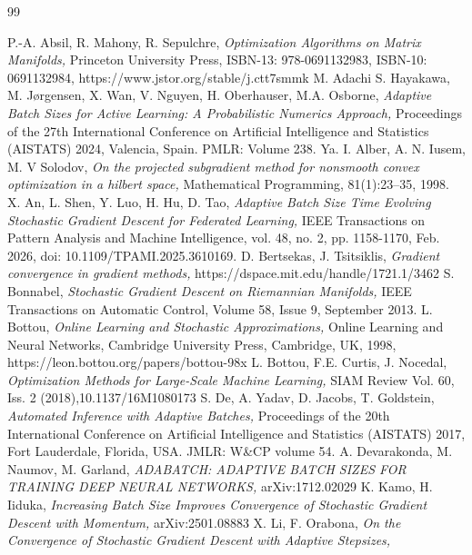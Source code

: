 \documentclass{amsart}
\theoremstyle{plain}
\theoremstyle{definition}
\theoremstyle{remark}
\numberwithin{theorem}{section}
\numberwithin{equation}{section}
\begin{document}
\begin{thebibliography}{99}
  
   P.-A. Absil, R. Mahony, R. Sepulchre,
   \emph{Optimization Algorithms on Matrix Manifolds,}
   Princeton University Press,  ISBN-13: 978-0691132983, ISBN-10: 0691132984, https://www.jstor.org/stable/j.ctt7smmk
   M. Adachi S. Hayakawa, M. Jørgensen, X. Wan, V. Nguyen, H. Oberhauser, M.A. Osborne,
   \emph{Adaptive Batch Sizes for Active Learning: A Probabilistic Numerics Approach,}
   Proceedings of the 27th International Conference on Artificial Intelligence and Statistics (AISTATS) 2024, Valencia, Spain. PMLR: Volume 238.
   Ya. I. Alber, A. N. Iusem, M. V Solodov,
   \emph{On the projected subgradient method for nonsmooth convex optimization in a hilbert space,}
   Mathematical Programming, 81(1):23--35, 1998. 
   X. An, L. Shen, Y. Luo, H. Hu, D. Tao,
   \emph{Adaptive Batch Size Time Evolving Stochastic Gradient Descent for Federated Learning,}
   IEEE Transactions on Pattern Analysis and Machine Intelligence, vol. 48, no. 2, pp. 1158-1170, Feb. 2026, doi: 10.1109/TPAMI.2025.3610169.
   D. Bertsekas, J. Tsitsiklis,
   \emph{Gradient convergence in gradient methods,} 
   https://dspace.mit.edu/handle/1721.1/3462
   S. Bonnabel,
   \emph{Stochastic Gradient Descent on Riemannian Manifolds,}
   IEEE Transactions on Automatic Control, Volume 58, Issue 9, September 2013. 
   L. Bottou,
   \emph{Online Learning and Stochastic Approximations,}
   Online Learning and Neural Networks, Cambridge University Press, Cambridge, UK, 1998,
	 https://leon.bottou.org/papers/bottou-98x
   L. Bottou, F.E. Curtis, J. Nocedal,
   \emph{Optimization Methods for Large-Scale Machine Learning,}
   SIAM Review Vol. 60, Iss. 2 (2018),10.1137/16M1080173
   S. De, A. Yadav, D. Jacobs, T. Goldstein,
   \emph{Automated Inference with Adaptive Batches,}
   Proceedings of the 20th International Conference on Artificial Intelligence and Statistics (AISTATS) 2017, Fort Lauderdale, Florida, USA. JMLR: W\&CP volume 54.
   A. Devarakonda, M. Naumov, M. Garland,
   \emph{ADABATCH: ADAPTIVE BATCH SIZES FOR TRAINING DEEP NEURAL NETWORKS,}
   arXiv:1712.02029
   K. Kamo, H. Iiduka,
   \emph{Increasing Batch Size Improves Convergence of Stochastic Gradient Descent with Momentum,}
   arXiv:2501.08883
   X. Li, F. Orabona,
   \emph{On the Convergence of Stochastic Gradient Descent with Adaptive Stepsizes,}

\end{thebibliography}
\end{document}
